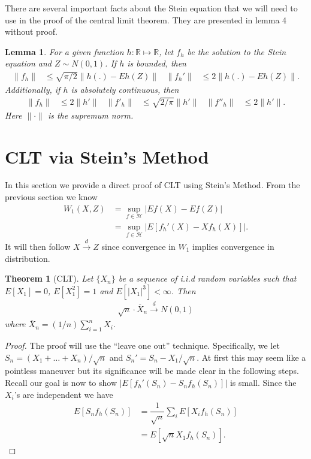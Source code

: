 \documentclass[11pt]{article}
\newcommand{\ind}{\overset{d}{\to}}
\newtheorem{lemma}{Lemma}
\newtheorem{theorem}{Theorem}
\begin{document}
\begin{flushleft}
There are several important facts about the Stein equation that we will need to use in the proof of the central limit theorem.
They are presented in lemma 4 without proof.
\begin{lemma}
For a given function $h: \mathbb{R} \mapsto \mathbb{R}$, let $f_h$ be the solution to the Stein equation and $Z \sim N(0,1)$. If $h$ is bounded, 
then
\begin{align*}
\| f_h \| &\leq \sqrt{\pi/2} \| h(.) - Eh(Z)\| & \| f_h' \| &\leq 2 \| h(.) - Eh(Z) \|.
\end{align*}
Additionally, if $h$ is absolutely continuous, then
\begin{align*}
\| f_h \| &\leq 2 \|h'\| & \|f'_h\| &\leq \sqrt{2/\pi} \|h'\| & \|f''_h\| &\leq 2 \|h'\|.
\end{align*}
Here $\| \cdot \|$ is the supremum norm.
\end{lemma}

\section{CLT via Stein's Method}
In this section we provide a direct proof of CLT using Stein's Method.
From the previous section we know
\begin{align*}
  W_{1}(X,Z) &= \sup_{f \in  \mathcal{H}} |Ef(X) - Ef(Z)|\\
  &= \sup_{f \in \mathcal{H}} |E[f_h'(X) - Xf_h(X)]|.
\end{align*}
It will then follow $X \ind Z$ since convergence in $W_1$ implies convergence in distribution.


\begin{theorem}[CLT]
Let $\{X_n\}$ be a sequence of i.i.d random variables such that $E[X_1] = 0$, $E[X_1^2 ] = 1$ and $E[|X_1|^3] < \infty$. Then
\begin{align*}
\sqrt{n} \cdot \overline{X}_n \ind N(0,1)
\end{align*}
where $\overline{X}_n = (1/n) \sum_{i=1}^{n} X_i$.
\end{theorem}
\begin{proof}
The proof will use the ``leave one out'' technique. Specifically, we let $S_n = (X_1 + \ldots + X_n)/\sqrt{n}$ and $S_n' = S_n - X_1/\sqrt{n}$. At first this may seem like a pointless maneuver but its significance will be made clear in the following steps. Recall our goal is now to show $|E[f_h'(S_n) - S_nf_h(S_n)]|$ is small. Since the $X_i$'s are independent we have
\begin{align*}
E[S_nf_h(S_n)] &= \dfrac{1}{\sqrt{n}} \sum_i E[X_i f_h(S_n)]\\
&= E[\sqrt{n} X_1 f_h(S_n)].
\end{align*}


\end{proof}
\end{flushleft}
\end{document}

